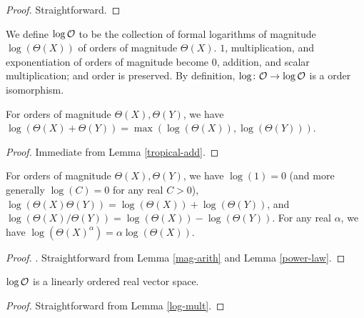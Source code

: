 \begin{proof} Straightforward.
\end{proof}

\begin{definition} \label{log-order-def}\leanok  We define $\log {\mathcal O}$ to be the collection of formal logarithms of magnitude $\log(\Theta(X))$ of orders of magnitude $\Theta(X)$.  $1$, multiplication, and exponentiation of orders of magnitude become $0$, addition, and scalar multiplication; and order is preserved. By definition, $\log \colon {\mathcal O} \to \log {\mathcal O}$ is a order isomorphism.
\end{definition}


\begin{lemma}\label{log-add}\leanok  For orders of magnitude $\Theta(X), \Theta(Y)$, we have $\log(\Theta(X) + \Theta(Y)) = \max(\log(\Theta(X)), \log(\Theta(Y)))$.
\end{lemma}

\begin{proof} Immediate from Lemma \ref{tropical-add}.
\end{proof}

\begin{lemma}\label{log-mult}  For orders of magnitude $\Theta(X), \Theta(Y)$, we have $\log(1) = 0$ (and more generally $\log(C) = 0$ for any real $C>0$), $\log(\Theta(X) \Theta(Y)) = \log(\Theta(X)) + \log(\Theta(Y))$, and $\log(\Theta(X) / \Theta(Y)) = \log(\Theta(X)) - \log(\Theta(Y))$.  For any real $\alpha$, we have $\log(\Theta(X)^\alpha) = \alpha \log(\Theta(X))$.
\end{lemma}

\begin{proof}. Straightforward from Lemma \ref{mag-arith} and Lemma \ref{power-law}.
\end{proof}


\begin{lemma}\label{ord-vec} $\log {\mathcal O}$ is a linearly ordered real vector space.
\end{lemma}

\begin{proof} Straightforward from Lemma \ref{log-mult}.
\end{proof}


